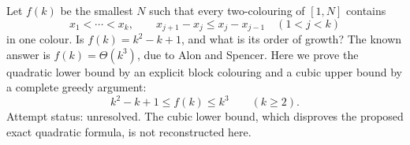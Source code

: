 Let \(f(k)\) be the smallest \(N\) such that every two-colouring of \([1,N]\) contains
\[
x_1<\cdots<x_k,\qquad
x_{j+1}-x_j\leq x_j-x_{j-1}\quad(1<j<k)
\]
in one colour. Is \(f(k)=k^2-k+1\), and what is its order of growth?
The known answer is \(f(k)=\Theta(k^3)\), due to Alon and Spencer. Here we prove the quadratic lower bound by an explicit block colouring and a cubic upper bound by a complete greedy argument:
\[
k^2-k+1\leq f(k)\leq k^3\qquad(k\geq2). \tag{1}
\]
Attempt status: unresolved. The cubic lower bound, which disproves the proposed exact quadratic formula, is not reconstructed here.
